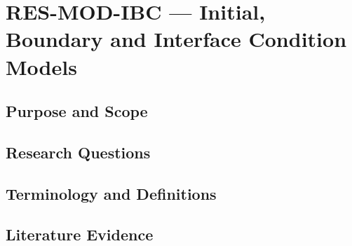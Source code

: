 
\section{RES-MOD-IBC --- Initial, Boundary and Interface Condition Models}
\label{sec:res-mod-ibc}

\subsection{Purpose and Scope}
\label{sec:res-mod-ibc-purpose}


\subsection{Research Questions}
\label{sec:res-mod-ibc-research-questions}


\subsection{Terminology and Definitions}
\label{sec:res-mod-ibc-definitions}


\subsection{Literature Evidence}
\label{sec:res-mod-ibc-literature-evidence}

%

